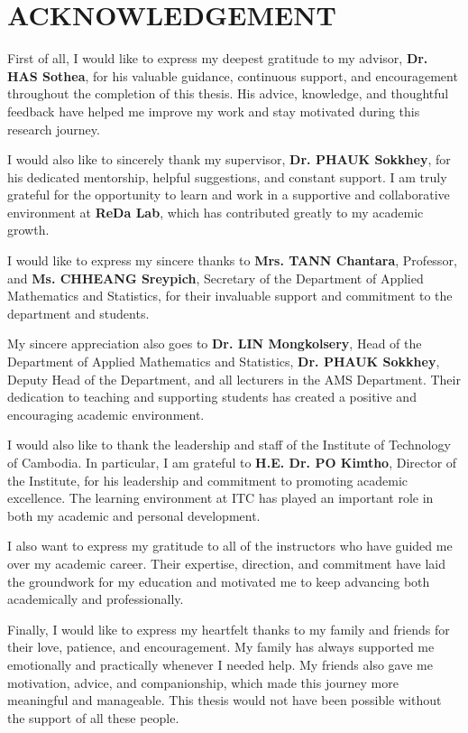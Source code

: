 \clearpage
{}
\chapter*{ACKNOWLEDGEMENT}

\hs First of all, I would like to express my deepest gratitude to my advisor, \textbf{Dr. HAS Sothea}, for his valuable guidance, continuous support, and encouragement throughout the completion of this thesis. His advice, knowledge, and thoughtful feedback have helped me improve my work and stay motivated during this research journey.

I would also like to sincerely thank my supervisor, \textbf{Dr. PHAUK Sokkhey}, for his dedicated mentorship, helpful suggestions, and constant support. I am truly grateful for the opportunity to learn and work in a supportive and collaborative environment at \textbf{ReDa Lab}, which has contributed greatly to my academic growth.

I would like to express my sincere thanks to \textbf{Mrs. TANN Chantara}, Professor, and \textbf{Ms. CHHEANG Sreypich}, Secretary of the Department of Applied Mathematics and Statistics, for their invaluable support and commitment to the department and students.

My sincere appreciation also goes to \textbf{Dr. LIN Mongkolsery}, Head of the Department of Applied Mathematics and Statistics, \textbf{Dr. PHAUK Sokkhey}, Deputy Head of the Department, and all lecturers in the AMS Department. Their dedication to teaching and supporting students has created a positive and encouraging academic environment.

I would also like to thank the leadership and staff of the Institute of Technology of Cambodia. In particular, I am grateful to \textbf{H.E. Dr. PO Kimtho}, Director of the Institute, for his leadership and commitment to promoting academic excellence. The learning environment at ITC has played an important role in both my academic and personal development.

I also want to express my gratitude to all of the instructors who have guided me over my academic career. Their expertise, direction, and commitment have laid the groundwork for my education and motivated me to keep advancing both academically and professionally.

Finally, I would like to express my heartfelt thanks to my family and friends for their love, patience, and encouragement. My family has always supported me emotionally and practically whenever I needed help. My friends also gave me motivation, advice, and companionship, which made this journey more meaningful and manageable. This thesis would not have been possible without the support of all these people.

